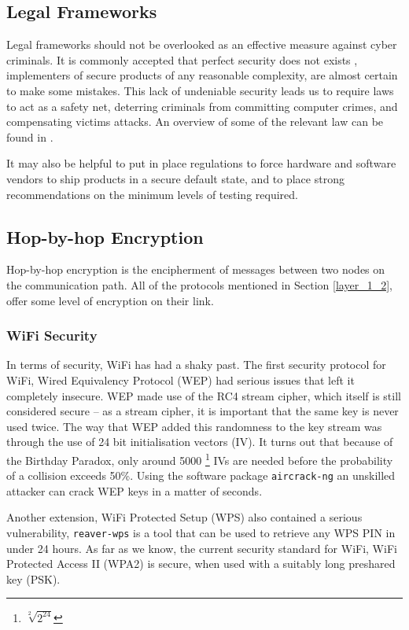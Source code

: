 \documentclass[10pt,journal,compsoc]{IEEEtran}
\begin{document}
\subsection{Legal Frameworks}
Legal frameworks should not be overlooked as an effective measure against cyber
criminals. It is commonly accepted that perfect security does not exists
\cite{ThereMustBeA}, implementers of secure products of any reasonable
complexity, are almost certain to make some mistakes. This lack of undeniable
security leads us to require laws to act as a safety net, deterring criminals
from committing computer crimes, and compensating victims attacks. An overview
of some of the relevant law can be found in \cite{Weber2010}. 

It may also be helpful to put in place regulations to force hardware and
software vendors to ship products in a secure default state, and to place
strong recommendations on the minimum levels of testing required. 

\subsection{Hop-by-hop Encryption}
Hop-by-hop encryption is the encipherment of messages between two nodes on the
communication path. All of the  protocols mentioned in Section \ref{layer_1_2}, offer
some level of encryption on their link. 

\subsubsection{WiFi Security}
In terms of security, WiFi has had a shaky past. The first security protocol
for WiFi, Wired Equivalency Protocol (WEP) had serious issues that left it
completely insecure. WEP made use of the RC4 stream cipher, which itself is
still considered secure -- as a stream cipher, it is important that the
same key is never used twice. The way that WEP added this randomness to the
key stream was through the use of 24 bit initialisation vectors (IV). It
turns out that because of the Birthday Paradox, only around 5000
\footnote{$ \sqrt[2]{2^24} $} IVs are needed before the probability of a
collision exceeds 50\%. Using the software package {\tt aircrack-ng} an
unskilled attacker can crack WEP keys in a matter of seconds. 


Another
extension, WiFi Protected Setup (WPS) also contained a serious
vulnerability, {\tt reaver-wps} is a tool that can be used to retrieve any
WPS PIN in under 24 hours. As far as we know, the current security standard
for WiFi, WiFi Protected Access II (WPA2) is secure, when used with a
suitably long preshared key (PSK). 
\end{document}
